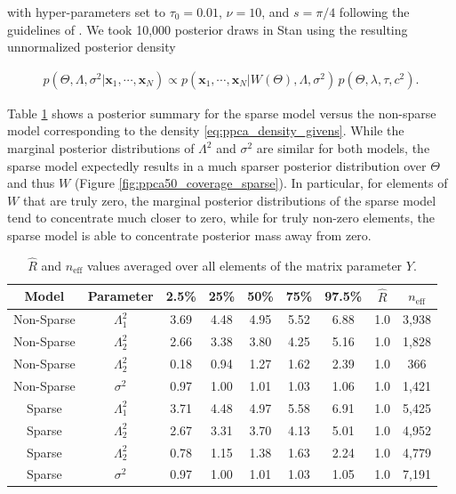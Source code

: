 \documentclass[ba]{imsart}
\newcommand{\mb}[1]{\mathbf{#1}}
\numberwithin{equation}{section}
\theoremstyle{plain}
\begin{document}
\noindent with hyper-parameters set to $\tau_0 = 0.01$, $\nu = 10$, and $s = \pi/4$ following the guidelines of \cite{piironen2017sparsity}. We took 10,000 posterior draws in Stan using the resulting unnormalized posterior density

\begin{eqnarray}
\label{eq:ppca_sparse_density_givens}
p(\Theta, \Lambda, \sigma^2 | \mb{x}_1, \cdots, \mb{x}_N) \propto p(\mb{x}_1, \cdots, \mb{x}_N | W(\Theta), \Lambda, \sigma^2)\, p(\Theta, \lambda, \tau, c^2).
\end{eqnarray}

\noindent Table \ref{tab:ppca50_sparse} shows a posterior summary for the sparse model versus the non-sparse model corresponding to the density \ref{eq:ppca_density_givens}. While the marginal posterior distributions of $\Lambda^2$ and $\sigma^2$ are similar for both models, the sparse model expectedly results in a much sparser posterior distribution over $\Theta$ and thus $W$ (Figure \ref{fig:ppca50_coverage_sparse}). In particular, for elements of $W$ that are truly zero, the marginal posterior distributions of the sparse model tend to concentrate much closer to zero, while for truly non-zero elements, the sparse model is able to concentrate posterior mass away from zero.

\begin{table}
\begin{tabular}{|cc||ccccccc|}
\hline
Model & Parameter & 2.5\% & 25\% & 50\% & 75\% & 97.5\% &  $\hat{R}$ & $n_{\mathrm{eff}}$\\
\hline
\hline
Non-Sparse & $\Lambda_1^2$  & 3.69 & 4.48 & 4.95 & 5.52 & 6.88 & 1.0 & 3,938\\
Non-Sparse & $\Lambda_2^2$  & 2.66 & 3.38 & 3.80 & 4.25 & 5.16 & 1.0 & 1,828\\
Non-Sparse & $\Lambda_2^2$  & 0.18 & 0.94 & 1.27 & 1.62 & 2.39 & 1.0 & 366 \\
Non-Sparse &  $\sigma^2$ & 0.97 & 1.00 & 1.01 & 1.03 & 1.06 & 1.0 & 1,421\\
\hline
Sparse & $\Lambda_1^2$  & 3.71 & 4.48 & 4.97 & 5.58 & 6.91 & 1.0 & 5,425\\
Sparse & $\Lambda_2^2$  & 2.67 & 3.31 & 3.70 & 4.13 & 5.01 & 1.0 & 4,952\\
Sparse & $\Lambda_2^2$  & 0.78 & 1.15 & 1.38 & 1.63 & 2.24 & 1.0 & 4,779 \\
Sparse &  $\sigma^2$ & 0.97 & 1.00 & 1.01 & 1.03 & 1.05 & 1.0 & 7,191\\
\hline
\end{tabular}
\caption{$\hat{R}$ and $n_{\mathrm{eff}}$ values averaged over all elements of the matrix parameter $Y$. }
\label{tab:ppca50_sparse}
\end{table}
\end{document}
